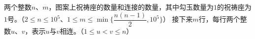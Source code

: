 两个整数$n$、$m$，图案上祝祷座的数量和连接的数量，其中勾玉数量为$1$的祝祷座为$1$号。（$2 \le n \le 10^5$、$1 \le m \le \min {\{\dfrac{n(n - 1)}{2}, 10^5\}}$）
接下来$m$行，每行两个整数$u$、$v$，表示$u$与$v$相连。（$1 \le u < v \le n$）